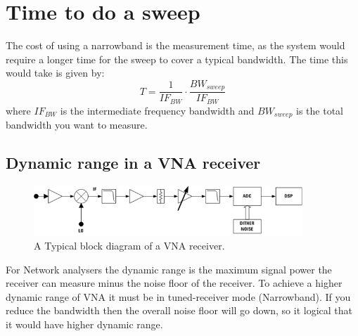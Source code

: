 \section{Time to do a sweep}
The cost of using a narrowband is the measurement time, as the system would require a longer time for the sweep to cover a typical bandwidth. The time this would take is given by:
\begin{equation}
T = \frac{1}{IF_{BW}} \cdot \frac{BW_{sweep}}{IF_{BW}}
\end{equation}
where $IF_{BW}$ is the intermediate frequency bandwidth and $BW_{sweep}$ is the total bandwidth you want to measure.


\subsection{Dynamic range in a VNA receiver}
\begin{figure}[H]
\centering
\includegraphics[width=0.90\textwidth]{figures/Block_VNA.png}
\caption{A Typical block diagram of a VNA receiver.}
\label{Block_VNA}
\end{figure}

For Network analysers the dynamic range is the maximum signal power the receiver can measure minus the noise floor of the receiver. To achieve a higher dynamic range of \gls{VNA} it must be  in tuned-receiver mode (Narrowband).
If you reduce the bandwidth then the overall noise floor will go down, so it logical that it would have higher dynamic range. \citep{AgilentNVA} \\

